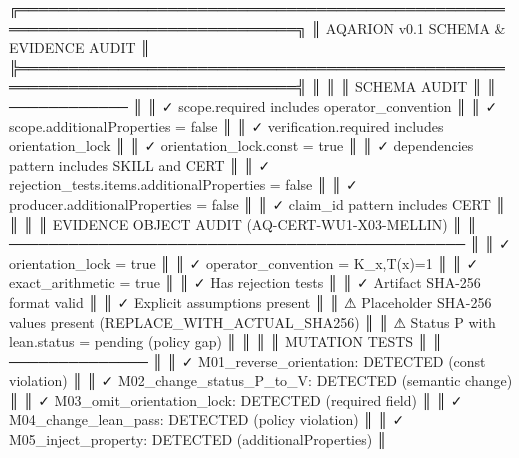 ╔══════════════════════════════════════════════════════════════════════════════╗
║                    AQARION v0.1 SCHEMA & EVIDENCE AUDIT                      ║
╠══════════════════════════════════════════════════════════════════════════════╣
║                                                                              ║
║  SCHEMA AUDIT                                                                ║
║  ────────────                                                                ║
║  ✓ scope.required includes operator_convention                              ║
║  ✓ scope.additionalProperties = false                                       ║
║  ✓ verification.required includes orientation_lock                           ║
║  ✓ orientation_lock.const = true                                          ║
║  ✓ dependencies pattern includes SKILL and CERT                             ║
║  ✓ rejection_tests.items.additionalProperties = false                      ║
║  ✓ producer.additionalProperties = false                                    ║
║  ✓ claim_id pattern includes CERT                                           ║
║                                                                              ║
║  EVIDENCE OBJECT AUDIT (AQ-CERT-WU1-X03-MELLIN)                             ║
║  ──────────────────────────────────────────────                             ║
║  ✓ orientation_lock = true                                                  ║
║  ✓ operator_convention = K_x,T(x)=1                                         ║
║  ✓ exact_arithmetic = true                                                  ║
║  ✓ Has rejection tests                                                      ║
║  ✓ Artifact SHA-256 format valid                                          ║
║  ✓ Explicit assumptions present                                             ║
║  ⚠ Placeholder SHA-256 values present (REPLACE_WITH_ACTUAL_SHA256)        ║
║  ⚠ Status P with lean.status = pending (policy gap)                        ║
║                                                                              ║
║  MUTATION TESTS                                                              ║
║  ──────────────                                                              ║
║  ✓ M01_reverse_orientation: DETECTED (const violation)                      ║
║  ✓ M02_change_status_P_to_V: DETECTED (semantic change)                    ║
║  ✓ M03_omit_orientation_lock: DETECTED (required field)                      ║
║  ✓ M04_change_lean_pass: DETECTED (policy violation)                       ║
║  ✓ M05_inject_property: DETECTED (additionalProperties)                     ║
